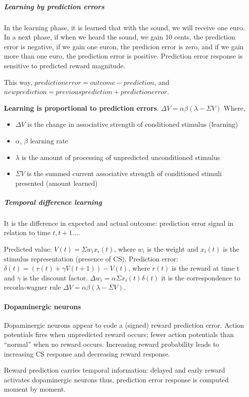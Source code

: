 \documentclass[12pt,article,oneside,a4paper]{memoir}
\begin{document}
\subparagraph{Learning by prediction errors}
In the learning phase, it is learned that with the sound, we will receive one
euro. In a next phase, if when we heard the sound, we gain 10 cents, the
prediction error is negative, if we gain one euron, the predicion error is
zero, and if we gain more than one euro, the prediction error is positive.
Prediction error response is sensitive to predicted reward magnitude.

This way, $prediction error = outcome - prediction$, and $new prediction = 
previous prediction + prediction error$.

\textbf{Learning is proportional to prediction errors}.
$\Delta V = \alpha \beta (\lambda - \Sigma V)$
Where, 
\begin{itemize}
\item $\Delta V$ is the change in associative strength of conditioned stimulus
(learning)
\item $\alpha$, $\beta$ learning rate
\item $\lambda$ is the amount of processing of unpredicted unconditioned
stimulus 
\item $\Sigma V$ is the summed current associative strength of conditioned
stimuli presented (amount learned)
\end{itemize}

\subparagraph{Temporal difference learning}
It is the difference in expected and actual outcome: prediction error signal in
relation to time $t, t+1...$.

Predicted value: $V(t) = \Sigma w_{i} x_{i}(t)$, where $w_{i}$ is the weight
and $x_{i}(t)$ is the stimulus representation (presence of CS).
Prediction error: $\delta(t) = (r(t) + \gamma V(t+1)) - V(t)$, where $r(t)$ is
the reward at time t and $\gamma$ is the discount factor.
$\Delta w_{i} = \alpha \Sigma x_{i}(t) \delta(t)$ it is the correspondence to
recorla-wagner rule $\Delta V = \alpha \beta (\lambda - \Sigma V)$.

\paragraph{Dopaminergic neurons} 
Dopaminergic neurons appear to code a (signed) reward prediction error. Action
potentials fires when unpredicted reward occurs; fewer action potentials than
``normal'' when no reward occurs. Increasing reward probability leads to
increasing CS response and decreasing reward response.

Reward prediction carries temporal information: delayed and early reward
activates dopaminergic neurons thus, prediction error response is computed
moment by moment.
\end{document}
